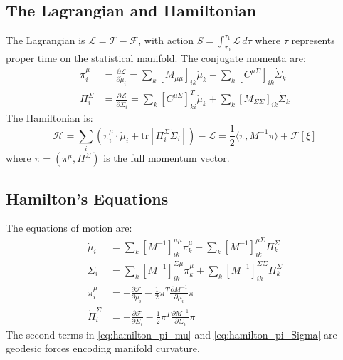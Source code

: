 \documentclass[11pt]{article}
\begin{document}
\subsection{The Lagrangian and Hamiltonian}

The Lagrangian is $\mathcal{L} = \mathcal{T} - \mathcal{F}$, with action $S = \int_{\tau_0}^{\tau_1} \mathcal{L} \, d\tau$ where $\tau$ represents proper time on the statistical manifold. The conjugate momenta are:
\begin{align}
\pi_i^\mu &= \frac{\partial \mathcal{L}}{\partial \dot{\mu}_i} = \sum_k [M_{\mu\mu}]_{ik} \dot{\mu}_k + \sum_k [C^{\mu\Sigma}]_{ik} \dot{\Sigma}_k \\
\Pi_i^\Sigma &= \frac{\partial \mathcal{L}}{\partial \dot{\Sigma}_i} = \sum_k [C^{\mu\Sigma}]_{ki}^T \dot{\mu}_k + \sum_k [M_{\Sigma\Sigma}]_{ik} \dot{\Sigma}_k
\end{align}
The Hamiltonian is:
\begin{equation}
\mathcal{H} = \sum_i \left(\pi_i^\mu \cdot \dot{\mu}_i + \mathrm{tr}[\Pi_i^\Sigma \dot{\Sigma}_i]\right) - \mathcal{L} = \frac{1}{2}\langle\pi, M^{-1}\pi\rangle + \mathcal{F}[\xi]
\label{eq:hamiltonian}
\end{equation}
where $\pi = (\pi^\mu, \Pi^\Sigma)$ is the full momentum vector.

\subsection{Hamilton's Equations}

The equations of motion are:
\begin{align}
\dot{\mu}_i &= \sum_k [M^{-1}]_{ik}^{\mu\mu} \pi_k^\mu + \sum_k [M^{-1}]_{ik}^{\mu\Sigma} \Pi_k^\Sigma \label{eq:hamilton_mu}\\
\dot{\Sigma}_i &= \sum_k [M^{-1}]_{ik}^{\Sigma\mu} \pi_k^\mu + \sum_k [M^{-1}]_{ik}^{\Sigma\Sigma} \Pi_k^\Sigma \label{eq:hamilton_Sigma}\\
\dot{\pi}_i^\mu &= -\frac{\partial \mathcal{F}}{\partial \mu_i} - \frac{1}{2}\pi^T \frac{\partial M^{-1}}{\partial \mu_i}\pi \label{eq:hamilton_pi_mu}\\
\dot{\Pi}_i^\Sigma &= -\frac{\partial \mathcal{F}}{\partial \Sigma_i} - \frac{1}{2}\pi^T \frac{\partial M^{-1}}{\partial \Sigma_i}\pi \label{eq:hamilton_pi_Sigma}
\end{align}
The second terms in \eqref{eq:hamilton_pi_mu} and \eqref{eq:hamilton_pi_Sigma} are geodesic forces encoding manifold curvature.
\end{document}
